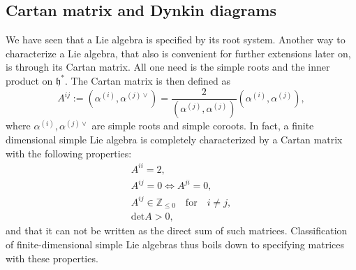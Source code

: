 \subsection{Cartan matrix and Dynkin diagrams}
We have seen that a Lie algebra is specified by its root system. Another way to characterize a Lie algebra, that also is convenient for further extensions later on, is through its Cartan matrix. All one need is the simple roots and the inner product on $\mathfrak{h}^*$. The Cartan matrix is then defined as 
\begin{equation}
    A^{ij} := (\alpha^{(i)},\alpha^{(j)\vee})  = \frac{2}{(\alpha^{(j)},\alpha^{(j)})}(\alpha^{(i)},\alpha^{(j)}),
\end{equation}
where $\alpha^{(i)},\alpha^{(j)\vee}$ are simple roots and simple coroots. In fact, a finite dimensional simple Lie algebra is completely characterized by a Cartan matrix with the following properties:
\begin{equation}
    \begin{aligned}
        A^{ii} = 2,\\
        A^{ij} = 0 \Longleftrightarrow A^{ji} = 0,\\
        A^{ij}\in \mathbb{Z}_{\leq 0} \quad\text{for}\quad i\neq j,\\
        \text{det}A >0,
    \end{aligned}
\end{equation}
and that it can not be written as the direct sum of such matrices. Classification of finite-dimensional simple Lie algebras thus boils down to specifying matrices with these properties. 


